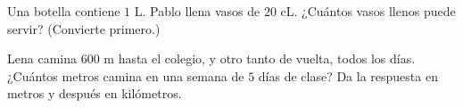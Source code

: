 \begin{exercise}[$\star\star$]\label{exo:g3:measure:10}
Una botella contiene $1$ L. Pablo llena vasos de $20$ cL. ¿Cuántos vasos
llenos puede servir? (Convierte primero.)
\end{exercise}

\begin{exercise}[$\star\star$]\label{exo:g3:measure:11}
Lena camina $600$ m hasta el colegio, y otro tanto de vuelta, todos los días. ¿Cuántos metros
camina en una semana de $5$ días de clase? Da la respuesta en metros
y después en kilómetros.
\end{exercise}
